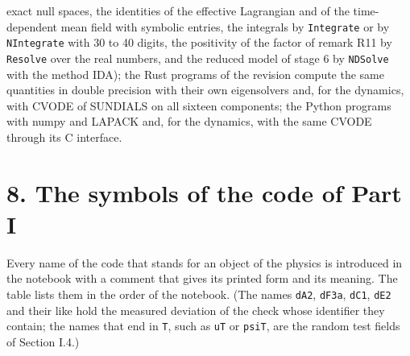 \documentclass[
  10pt,
]{article}
\begin{document}
\begin{itemize}
  exact null spaces, the identities of the effective Lagrangian and of
  the time-dependent mean field with symbolic entries, the integrals by
  \texttt{Integrate} or by \texttt{NIntegrate} with 30 to 40 digits, the
  positivity of the factor of remark R11 by \texttt{Resolve} over the
  real numbers, and the reduced model of stage 6 by \texttt{NDSolve}
  with the method IDA); the Rust programs of the revision compute the
  same quantities in double precision with their own eigensolvers and,
  for the dynamics, with CVODE of SUNDIALS on all sixteen components;
  the Python programs with numpy and LAPACK and, for the dynamics, with
  the same CVODE through its C interface.
\end{itemize}

\hypertarget{the-symbols-of-the-code-of-part-i}{%
\section{8. The symbols of the code of Part
I}\label{the-symbols-of-the-code-of-part-i}}

Every name of the code that stands for an object of the physics is
introduced in the notebook with a comment that gives its printed form
and its meaning. The table lists them in the order of the notebook. (The
names \texttt{dA2}, \texttt{dF3a}, \texttt{dC1}, \texttt{dE2} and their
like hold the measured deviation of the check whose identifier they
contain; the names that end in \texttt{T}, such as \texttt{uT} or
\texttt{psiT}, are the random test fields of Section I.4.)
\end{document}
